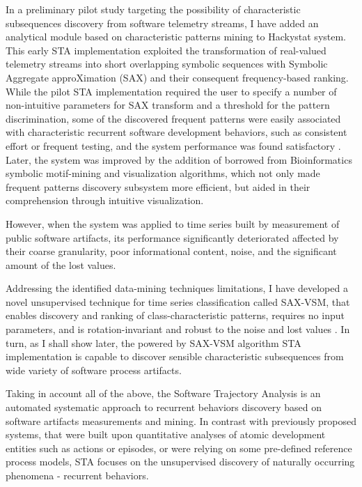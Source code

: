 In a preliminary pilot study targeting the possibility of characteristic subsequences discovery from 
software telemetry streams, I have added an analytical module based on characteristic patterns mining 
to Hackystat system. This early STA implementation exploited the transformation of real-valued telemetry 
streams into short overlapping symbolic sequences with Symbolic Aggregate approXimation (SAX) \cite{sax} 
and their consequent frequency-based ranking. 
While the pilot STA implementation required the user to specify a number of non-intuitive parameters for 
SAX transform and a threshold for the pattern discrimination, some of the discovered frequent patterns 
were easily associated with characteristic recurrent software development behaviors, such as consistent 
effort or frequent testing, and the system performance was found satisfactory \cite{csdl2-10-09}.
Later, the system was improved by the addition of borrowed from Bioinformatics symbolic motif-mining and 
visualization algorithms, which not only made frequent patterns discovery subsystem more efficient, 
but aided in their comprehension through intuitive visualization. 

However, when the system was applied to time series built by measurement of public software artifacts, 
its performance significantly deteriorated affected by their coarse granularity, poor informational content,
noise, and the significant amount of the lost values. 

Addressing the identified data-mining techniques limitations, 
I have developed a novel unsupervised technique for time series classification called SAX-VSM, that enables 
discovery and ranking of class-characteristic patterns, requires no input parameters, and is rotation-invariant 
and robust to the noise and lost values \cite{sax-vsm}. 
In turn, as I shall show later, the powered by SAX-VSM algorithm STA implementation is capable to discover 
sensible characteristic subsequences from wide variety of software process artifacts.

Taking in account all of the above, the Software Trajectory Analysis is an automated systematic approach to 
recurrent behaviors discovery based on software artifacts measurements and mining. 
In contrast with previously proposed systems, that were built upon quantitative analyses of atomic development 
entities such as actions or episodes, or were relying on some pre-defined reference process models, 
STA focuses on the unsupervised discovery of naturally occurring phenomena - recurrent behaviors. 

